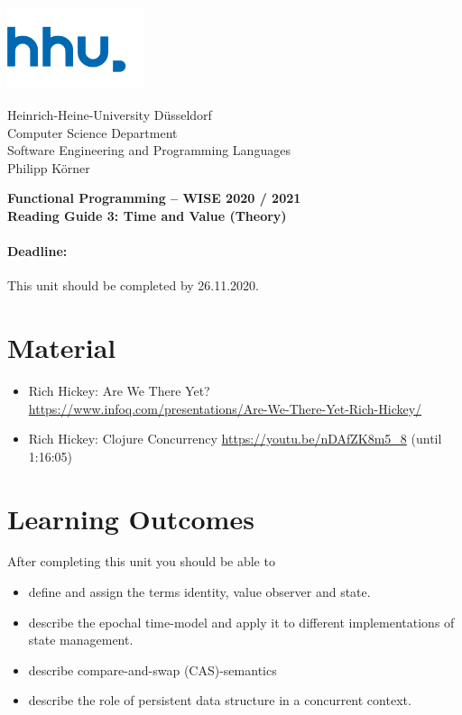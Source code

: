 \documentclass[11pt,a4paper]{article}
\begin{document}
	
\begin{minipage}[b]{\textwidth}
	\parbox[t]{5cm}{%
		\includegraphics[width=4cm]{unilogo}
		\hfill
	}
	\parbox[b]{11cm}{%
		Heinrich-Heine-University D\"usseldorf\\
		Computer Science Department\\
		Software Engineering and Programming Languages\\
		Philipp K\"orner
	}
\end{minipage}
\begin{center}
	\bf
	Functional Programming -- WISE 2020 / 2021\\
	Reading Guide 3: Time and Value (Theory)
\end{center}

\pagestyle{empty}

\paragraph{Deadline:} This unit should be completed by 26.11.2020.

\section{Material} 

\begin{itemize}
\item Rich Hickey: Are We There Yet? \\ \url{https://www.infoq.com/presentations/Are-We-There-Yet-Rich-Hickey/}
\item Rich Hickey: Clojure Concurrency \url{https://youtu.be/nDAfZK8m5_8} (until 1:16:05)
\end{itemize}


\section{Learning Outcomes}

After completing this unit you should be able to

\begin{itemize}
	\item define and assign the terms identity, value observer and state.
    \item describe the epochal time-model and apply it to different implementations of state management.
    \item describe compare-and-swap (CAS)-semantics
    \item describe the role of persistent data structure in a concurrent context.
\end{itemize}
\end{document}
